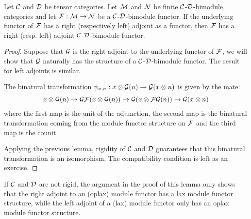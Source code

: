 \documentclass{amsart}
\begin{document}
\begin{lemma} \label{lma:module-adjoint}
Let $\mathcal C$ and $\mathcal D$ be tensor categories. Let  $\mathcal M$ and  $\mathcal N$  be finite $\mathcal C$-$\mathcal D$-bimodule categories and let $\mathcal F: \mathcal M \to \mathcal N$ be a $\mathcal C$-$\mathcal D$-bimodule functor.  If the underlying functor of $\mathcal F$ has a right (respectively left) adjoint as a functor, then $\mathcal F$ has a right (resp. left) adjoint $\mathcal C$-$\mathcal D$-bimodule functor. 
\end{lemma}
\begin{proof}
Suppose that $\mathcal G$ is the right adjoint to the underlying functor of $\mathcal F$, we will show that $\mathcal G$ naturally has the structure of a $\mathcal C$-$\mathcal D$-bimodule functor.  The result for left adjoints is similar.

The binatural transformation $\psi_{x,n}: x \otimes \mathcal G(n) \rightarrow \mathcal G(x \otimes n)$ is given by the mate:
$$x \otimes \mathcal G(n) \rightarrow \mathcal G \mathcal F(x \otimes \mathcal G(n)) \rightarrow \mathcal G(x \otimes \mathcal F\mathcal G(n)) \rightarrow \mathcal G(x \otimes n)$$
where the first map is the unit of the adjunction, the second map is the binatural transformation coming from the module functor structure on $\mathcal F$ and the third map is the counit.  
\begin{center}
\end{center}

Applying the previous lemma, rigidity of $\mathcal C$ and $\mathcal D$ guarantees that this binatural transformation is an isomorphism.  The compatibility condition is left as an exercise.
\end{proof}

\begin{remark}
If $\mathcal C$ and $\mathcal D$ are not rigid, the argument in the proof of this lemma only shows that the right adjoint to an (oplax) module functor has a lax module functor structure, while the left adjoint of a (lax) module functor only has an oplax module functor structure.  %
\end{remark}
\end{document}
